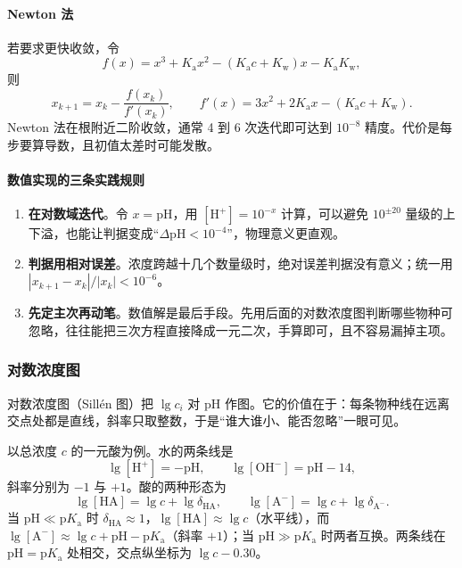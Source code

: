 \documentclass[UTF8]{ctexbook}
\begin{document}
\paragraph{Newton 法} 若要求更快收敛，令
\[
f(x)=x^3+K_{\mathrm{a}}x^2-(K_{\mathrm{a}}c+K_{\mathrm{w}})x-K_{\mathrm{a}}K_{\mathrm{w}},
\]
则
\[
x_{k+1}=x_k-\frac{f(x_k)}{f'(x_k)},
\qquad
f'(x)=3x^2+2K_{\mathrm{a}}x-(K_{\mathrm{a}}c+K_{\mathrm{w}}).
\]
Newton 法在根附近二阶收敛，通常 4 到 6 次迭代即可达到 $10^{-8}$ 精度。代价是每步要算导数，且初值太差时可能发散。

\paragraph{数值实现的三条实践规则}

\begin{enumerate}
  \item \textbf{在对数域迭代}。令 $x=\mathrm{pH}$，用 $[\mathrm{H^+}]=10^{-x}$ 计算，可以避免 $10^{\pm20}$ 量级的上下溢，也能让判据变成“$\Delta\mathrm{pH}<10^{-4}$”，物理意义更直观。
  \item \textbf{判据用相对误差}。浓度跨越十几个数量级时，绝对误差判据没有意义；统一用 $|x_{k+1}-x_k|/|x_k|<10^{-6}$。
  \item \textbf{先定主次再动笔}。数值解是最后手段。先用后面的对数浓度图判断哪些物种可忽略，往往能把三次方程直接降成一元二次，手算即可，且不容易漏掉主项。
\end{enumerate}

\subsubsection{对数浓度图}

对数浓度图（Sillén 图）把 $\lg c_i$ 对 $\mathrm{pH}$ 作图。它的价值在于：每条物种线在远离交点处都是直线，斜率只取整数，于是“谁大谁小、能否忽略”一眼可见。

以总浓度 $c$ 的一元酸为例。水的两条线是
\[
\lg[\mathrm{H^+}]=-\mathrm{pH},
\qquad
\lg[\mathrm{OH^-}]=\mathrm{pH}-14,
\]
斜率分别为 $-1$ 与 $+1$。酸的两种形态为
\[
\lg[\mathrm{HA}]=\lg c+\lg\delta_{\mathrm{HA}},
\qquad
\lg[\mathrm{A^-}]=\lg c+\lg\delta_{\mathrm{A^-}}.
\]
当 $\mathrm{pH}\ll\mathrm{p}K_{\mathrm{a}}$ 时 $\delta_{\mathrm{HA}}\approx1$，$\lg[\mathrm{HA}]\approx\lg c$（水平线），而 $\lg[\mathrm{A^-}]\approx\lg c+\mathrm{pH}-\mathrm{p}K_{\mathrm{a}}$（斜率 $+1$）；当 $\mathrm{pH}\gg\mathrm{p}K_{\mathrm{a}}$ 时两者互换。两条线在 $\mathrm{pH}=\mathrm{p}K_{\mathrm{a}}$ 处相交，交点纵坐标为 $\lg c-0.30$。
\end{document}

